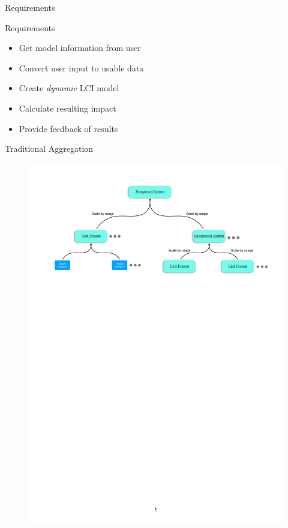\begin{frame}
\centering
\Large
Requirements
\end{frame}

\begin{frame}{Requirements}
    \begin{itemize}
        \item Get model information from user
        \item Convert user input to usable data
        \item Create \emph{dynamic} LCI model
        \item Calculate resulting impact
        \item Provide feedback of results
    \end{itemize}
\end{frame}







\begin{frame}{Traditional Aggregation}

\vfill
\begin{figure}
    \centering
    \includegraphics[page=1, width = \linewidth]{.figures/ImpactAggregationExtension.pdf}
\end{figure}

\end{frame}

